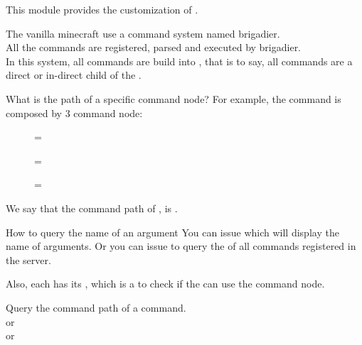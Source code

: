 \label{ch:command_permission}

This module provides the customization of .


The vanilla minecraft use a command system named brigadier.\\
All the commands are registered, parsed and executed by brigadier. \\
In this system, all commands are build into , that is to say, all commands are a direct or in-direct child of the .

\begin{example}{What is the path of a specific command node?}
    For example, the command  is composed by 3 command node:
    \begin{description}
        \item [] = 
        \item [] = 
        \item [] = 
    \end{description}
    We say that the command path of , is .

    \begin{tips}{How to query the name of an argument}
        You can issue  which will display the name of arguments.
        Or you can issue  to query the  of all commands registered in the server.
    \end{tips}
\end{example}

Also, each  has its , which is a  to check if the  can use the command node.

\begin{tips}{Query the command path of a command.}
    \\
    or \\
    or 
\end{tips}


